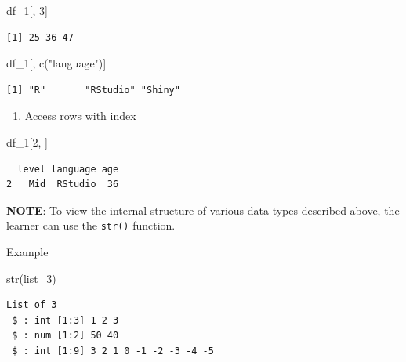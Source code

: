 \documentclass[
  letterpaper,
  DIV=11,
  numbers=noendperiod]{scrreprt}
\newenvironment{Shaded}{\begin{snugshade}}{\end{snugshade}}
\newcommand{\DecValTok}[1]{\textcolor[rgb]{0.68,0.00,0.00}{#1}}
\newcommand{\FunctionTok}[1]{\textcolor[rgb]{0.28,0.35,0.67}{#1}}
\newcommand{\NormalTok}[1]{\textcolor[rgb]{0.00,0.23,0.31}{#1}}
\newcommand{\StringTok}[1]{\textcolor[rgb]{0.13,0.47,0.30}{#1}}
\providecommand{\tightlist}{%
  \setlength{\itemsep}{0pt}\setlength{\parskip}{0pt}}\usepackage{longtable,booktabs,array}
\begin{document}
\begin{Shaded}
\begin{Highlighting}[]
\NormalTok{df\_1[, }\DecValTok{3}\NormalTok{]}
\end{Highlighting}
\end{Shaded}

\begin{verbatim}
[1] 25 36 47
\end{verbatim}

\begin{Shaded}
\begin{Highlighting}[]
\NormalTok{df\_1[, }\FunctionTok{c}\NormalTok{(}\StringTok{"language"}\NormalTok{)]}
\end{Highlighting}
\end{Shaded}

\begin{verbatim}
[1] "R"       "RStudio" "Shiny"  
\end{verbatim}

\begin{enumerate}
\def\labelenumi{\alph{enumi}.}
\setcounter{enumi}{10}
\tightlist
\item
  Access rows with index
\end{enumerate}

\begin{Shaded}
\begin{Highlighting}[]
\NormalTok{df\_1[}\DecValTok{2}\NormalTok{, ] }
\end{Highlighting}
\end{Shaded}

\begin{verbatim}
  level language age
2   Mid  RStudio  36
\end{verbatim}

\textbf{NOTE}: To view the internal structure of various data types
described above, the learner can use the \texttt{str()} function.

Example

\begin{Shaded}
\begin{Highlighting}[]
\FunctionTok{str}\NormalTok{(list\_3)}
\end{Highlighting}
\end{Shaded}

\begin{verbatim}
List of 3
 $ : int [1:3] 1 2 3
 $ : num [1:2] 50 40
 $ : int [1:9] 3 2 1 0 -1 -2 -3 -4 -5
\end{verbatim}
\end{document}

